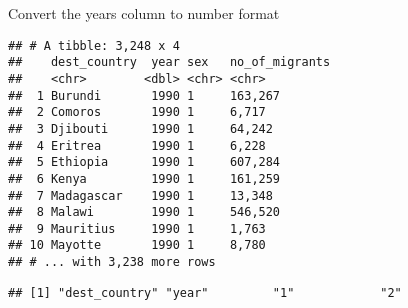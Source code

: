 \documentclass[]{article}
\newenvironment{Shaded}{\begin{snugshade}}{\end{snugshade}}
\newcommand{\KeywordTok}[1]{\textcolor[rgb]{0.13,0.29,0.53}{\textbf{#1}}}
\newcommand{\DataTypeTok}[1]{\textcolor[rgb]{0.13,0.29,0.53}{#1}}
\newcommand{\StringTok}[1]{\textcolor[rgb]{0.31,0.60,0.02}{#1}}
\newcommand{\OperatorTok}[1]{\textcolor[rgb]{0.81,0.36,0.00}{\textbf{#1}}}
\newcommand{\NormalTok}[1]{#1}
\begin{document}
Convert the years column to number format

\begin{Shaded}
\end{Shaded}

\begin{verbatim}
## # A tibble: 3,248 x 4
##    dest_country  year sex   no_of_migrants
##    <chr>        <dbl> <chr> <chr>         
##  1 Burundi       1990 1     163,267       
##  2 Comoros       1990 1     6,717         
##  3 Djibouti      1990 1     64,242        
##  4 Eritrea       1990 1     6,228         
##  5 Ethiopia      1990 1     607,284       
##  6 Kenya         1990 1     161,259       
##  7 Madagascar    1990 1     13,348        
##  8 Malawi        1990 1     546,520       
##  9 Mauritius     1990 1     1,763         
## 10 Mayotte       1990 1     8,780         
## # ... with 3,238 more rows
\end{verbatim}

\begin{Shaded}
\end{Shaded}

\begin{verbatim}
## [1] "dest_country" "year"         "1"            "2"
\end{verbatim}

\begin{Shaded}
\end{Shaded}
\end{document}
